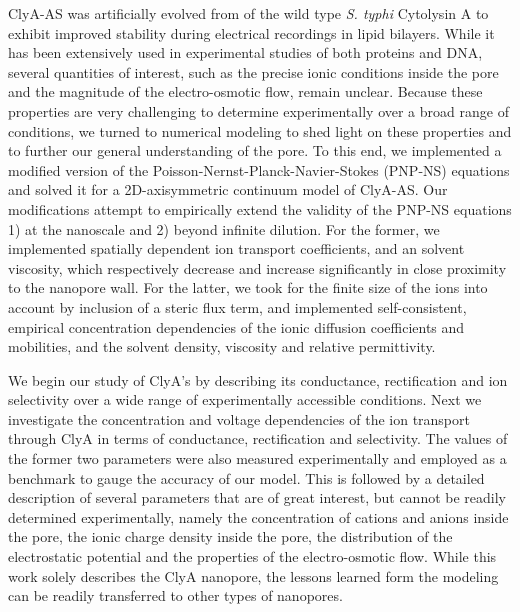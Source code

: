 \documentclass[journal=ancac3,manuscript=article,etalmode=truncate,maxauthors=0,layout=twocolumn]{achemso}
\begin{document}
ClyA-AS was artificially evolved from of the wild type \textit{S. typhi} Cytolysin A to exhibit improved 
stability during electrical recordings in lipid bilayers.\cite{Soskine-2013} While it has been extensively 
used in experimental studies of both proteins\cite{Soskine-2013,VanMeervelt-2014,Soskine-Biesemans-2015,
Biesemans-Soskine-2015,Wloka-2017,VanMeervelt-2017} and DNA,\cite{Franceschini-2013,Franceschini-2016} 
several quantities of interest, such as the precise ionic conditions inside the pore and the magnitude of the 
electro-osmotic flow, remain unclear. Because these properties are very challenging to determine 
experimentally over a broad range of conditions, we turned to numerical modeling to shed light on these 
properties and to further our general understanding of the pore.
To this end, we implemented a modified version of the Poisson-Nernst-Planck-Navier-Stokes (PNP-NS) equations 
and solved it for a 2D-axisymmetric continuum model of ClyA-AS. Our modifications attempt to empirically 
extend the validity of the PNP-NS equations 1) at the nanoscale and 2) beyond infinite dilution. For the 
former, we  implemented spatially dependent ion transport coefficients,\cite{Makarov-1998, Simakov-2010} and 
an solvent viscosity\cite{Pronk-2014,Hsu-2017}, which respectively decrease and increase significantly in 
close proximity to the nanopore wall. For the latter, we took for the finite size of the ions into account by 
inclusion of a steric flux term,\cite{Lu-2011} and implemented self-consistent, empirical concentration 
dependencies of the ionic diffusion coefficients and mobilities,\cite{Baldessari-2008-1} and the solvent 
density,\cite{} viscosity and relative permittivity.\cite{Gavish-2016}

We begin our study of ClyA's by describing its conductance, rectification and ion selectivity over a wide 
range of experimentally accessible conditions. Next we investigate the concentration and voltage dependencies 
of the ion transport through ClyA in 
terms of conductance, rectification and selectivity. The values of the former two parameters were also 
measured experimentally and employed as a benchmark to gauge the accuracy of our model. This is followed by a 
detailed description of several parameters that are of great interest, but cannot be readily determined 
experimentally, namely the concentration of cations and anions inside the pore, the ionic charge density 
inside the pore, the distribution of the electrostatic potential and the properties of the electro-osmotic 
flow. While this work solely describes the ClyA nanopore, the lessons learned form the modeling can be 
readily transferred to other types of nanopores.
\end{document}
